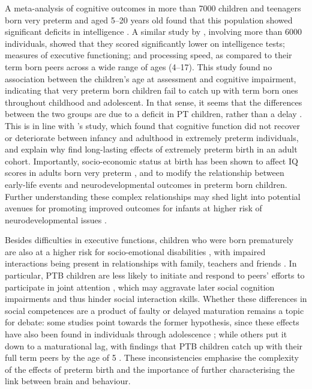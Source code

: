 A meta-analysis of cognitive outcomes in more than 7000 children and teenagers born very preterm and aged 5--20 years old found that this population showed significant deficits in intelligence \cite{Twilhaar2018}. A similar study by \citet{Brydges2018}, involving more than 6000 individuals, showed that they scored significantly lower on intelligence tests; measures of executive functioning; and processing speed, as compared to their term born peers across a wide range of ages (4--17). This study found no association between the children's age at assessment and cognitive impairment, indicating that very preterm born children fail to catch up with term born ones throughout childhood and adolescent. In that sense, it seems that the differences between the two groups are due to a deficit in PT children, rather than a delay \citep{Brydges2018}. This is in line with \citep{Linsell2018}'s study, which found that cognitive function did not recover or deteriorate between infancy and adulthood in extremely preterm individuals, and explain why \citep{Doyle2010} find long-lasting effects of extremely preterm birth in an adult cohort. Importantly, socio-economic status at birth has been shown to affect IQ scores in adults born very preterm \citep{Breeman2017}, and to modify the relationship between early-life events and neurodevelopmental outcomes in preterm born children. Further understanding these complex relationships may shed light into potential avenues for promoting improved outcomes for infants at higher risk of neurodevelopmental issues \citep{Benavente-Fernandez2020}. 

Besides difficulties in executive functions, children who were born prematurely are also at a higher risk for socio-emotional disabilities \citep{Zmyj2017}, with impaired interactions being present in relationships with family, teachers and friends \citep{Twilhaar2019}. In particular, PTB children are less likely to initiate and respond to peers' efforts to participate in joint attention \citep{Zmyj2017}, which may aggravate later social cognition impairments and thus hinder social interaction skills. Whether these differences in social competences are a product of faulty or delayed maturation remains a topic for debate: some studies point towards the former hypothesis, since these effects have also been found in individuals through adolescence  \citep{Healy2013, Saigal2016}; while others put it down to a maturational lag, with findings that PTB children catch up with their full term peers by the age of 5 \citep{Witt2018}. These inconsistencies emphasise the complexity of the effects of preterm birth and the importance of further characterising the link between brain and behaviour.

